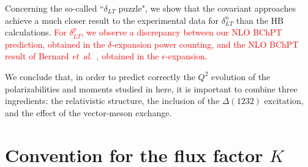 \documentclass[twocolumn,prc,showpacs,nofootinbib,preprintnumbers,amsmath,amssymb,superscriptaddress]{revtex4-1}
\begin{document}

Concerning the so-called ``$\delta_{LT}$ puzzle", we show that the covariant approaches achieve a much closer result to the experimental data for $\delta^n_{LT}$ than the HB calculations. \textcolor{red}{For $\delta^p_{LT}$, we observe a discrepancy between our NLO BChPT prediction, obtained in the $\delta$-expansion power counting, and the NLO BChPT result of Bernard {\it et~al.}~\cite{Bernard:2012hb}, obtained in the $\epsilon$-expansion.}

We conclude that, in order to predict correctly the $Q^2$ evolution of the polarizabilities and moments studied in here, it is important to combine three ingredients: the relativistic structure, the inclusion of the $\Delta(1232)$ excitation, and the effect of the vector-meson exchange.


\appendix


\section{Convention for the flux factor $K$} \label{App:FluxFactor}
\end{document}
